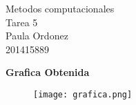 \documentclass[12pt]{article}
\begin{document}
\begin{centering}
\begin{huge}
Metodos computacionales\\
Tarea 5\\
Paula Ordonez\\
201415889
\end{huge}
\end{centering}
\begin{center}
\textbf{Grafica Obtenida}
\end{center}

\begin{figure}[h!]
\texttt{[image: grafica.png]}
\end{figure}
\end{document}

